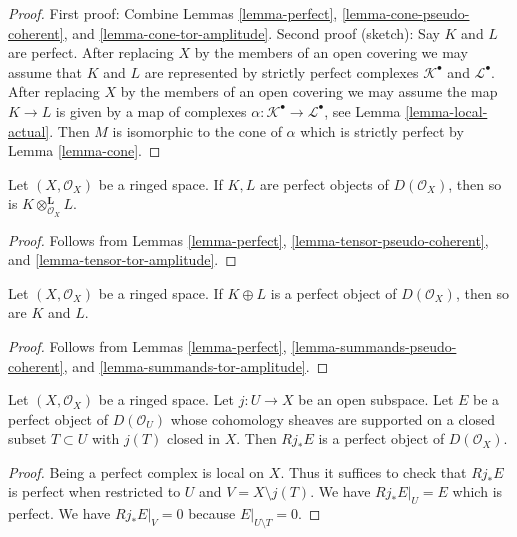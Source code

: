 \begin{proof}
First proof: Combine
Lemmas \ref{lemma-perfect}, \ref{lemma-cone-pseudo-coherent}, and
\ref{lemma-cone-tor-amplitude}.
Second proof (sketch): Say $K$ and $L$ are perfect. After replacing
$X$ by the members of an open covering we may assume that $K$ and $L$
are represented by strictly perfect complexes $\mathcal{K}^\bullet$
and $\mathcal{L}^\bullet$. After replacing $X$ by the members
of an open covering we may assume the map $K \to L$ is given by
a map of complexes $\alpha : \mathcal{K}^\bullet \to \mathcal{L}^\bullet$,
see Lemma \ref{lemma-local-actual}.
Then $M$ is isomorphic to the cone of $\alpha$ which is strictly
perfect by Lemma \ref{lemma-cone}.
\end{proof}

\begin{lemma}
\label{lemma-tensor-perfect}
Let $(X, \mathcal{O}_X)$ be a ringed space.
If $K, L$ are perfect objects of $D(\mathcal{O}_X)$, then
so is $K \otimes_{\mathcal{O}_X}^\mathbf{L} L$.
\end{lemma}

\begin{proof}
Follows from
Lemmas \ref{lemma-perfect}, \ref{lemma-tensor-pseudo-coherent}, and
\ref{lemma-tensor-tor-amplitude}.
\end{proof}

\begin{lemma}
\label{lemma-summands-perfect}
Let $(X, \mathcal{O}_X)$ be a ringed space.
If $K \oplus L$ is a perfect object of $D(\mathcal{O}_X)$, then
so are $K$ and $L$.
\end{lemma}

\begin{proof}
Follows from
Lemmas \ref{lemma-perfect}, \ref{lemma-summands-pseudo-coherent}, and
\ref{lemma-summands-tor-amplitude}.
\end{proof}

\begin{lemma}
\label{lemma-pushforward-perfect}
Let $(X, \mathcal{O}_X)$ be a ringed space. Let $j : U \to X$ be an
open subspace. Let $E$ be a perfect object of $D(\mathcal{O}_U)$
whose cohomology
sheaves are supported on a closed subset $T \subset U$ with $j(T)$
closed in $X$. Then $Rj_*E$ is a perfect object of $D(\mathcal{O}_X)$.
\end{lemma}

\begin{proof}
Being a perfect complex is local on $X$. Thus it suffices to check that
$Rj_*E$ is perfect when restricted to $U$ and $V = X \setminus j(T)$.
We have $Rj_*E|_U = E$ which is perfect. We have
 $Rj_*E|_V = 0$ because $E|_{U \setminus T} = 0$.
\end{proof}

